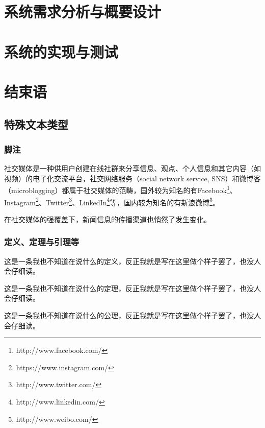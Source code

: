 \documentclass[a4paper,AutoFakeBold,oneside,12pt]{book}
\begin{document}
\chapter{系统需求分析与概要设计}

\chapter{系统的实现与测试}

\chapter{结束语}



\section{特殊文本类型}
\subsection{脚注}
社交媒体是一种供用户创建在线社群来分享信息、观点、个人信息和其它内容（如视频）的电子化交流平台，社交网络服务（social network service, SNS）和微博客（microblogging）都属于社交媒体的范畴\cite{webster_social_media}，国外较为知名的有Facebook\footnote{http://www.facebook.com/}、Instagram\footnote{https://www.instagram.com/}、Twitter\footnote{http://www.twitter.com/}、LinkedIn\footnote{http://www.linkedin.com/}等，国内较为知名的有新浪微博\footnote{http://www.weibo.com/}。

在社交媒体的强覆盖下，新闻信息的传播渠道也悄然了发生变化。\cite{false_news_spread_2018}

\subsection{定义、定理与引理等}
\begin{definition}
	这是一条我也不知道在说什么的定义，反正我就是写在这里做个样子罢了，也没人会仔细读。\cite{周兴2017基于深度学习的谣言检测及模式挖掘}
\end{definition}

\begin{theorem}
	这是一条我也不知道在说什么的定理，反正我就是写在这里做个样子罢了，也没人会仔细读。
\end{theorem}

\begin{axiom}
	这是一条我也不知道在说什么的公理，反正我就是写在这里做个样子罢了，也没人会仔细读。
\end{axiom}
\end{document}
